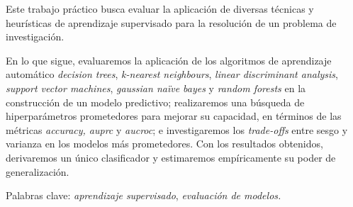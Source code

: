 Este trabajo práctico busca evaluar la aplicación de diversas técnicas y heurísticas de aprendizaje supervisado 
para la resolución de un problema de investigación. 


En lo que sigue, evaluaremos la aplicación de los algoritmos de aprendizaje automático \textit{decision trees}, \textit{k-nearest neighbours}, \textit{linear discriminant analysis}, \textit{support vector machines}, \textit{gaussian naïve bayes} y \textit{random forests} en la construcción de un modelo predictivo; realizaremos una búsqueda de hiperparámetros prometedores para mejorar su capacidad, en términos de las métricas \textit{accuracy, auprc} y \textit{aucroc}; e investigaremos los \textit{trade-offs} entre sesgo y varianza en los modelos más prometedores. Con los resultados obtenidos, derivaremos un único clasificador y estimaremos empíricamente su poder de generalización.


\vspace{1em}
\noindent Palabras clave: \textit{aprendizaje supervisado}, \textit{evaluación de modelos.}
